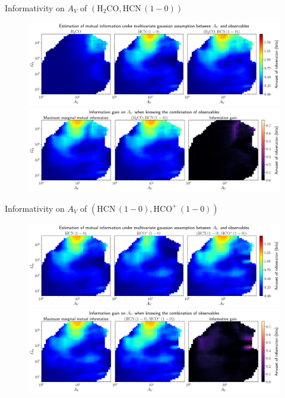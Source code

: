 \documentclass{beamer}
\begin{document}
\begin{frame}{Informativity on $A_V$ of $\left(\mathrm{H_2CO},\mathrm{HCN\,(1-0)}\right)$}
    \begin{figure}
        \centering
        \includegraphics[width=0.95\linewidth]{../linearinfo/av__h2co_hcn10_linearinfo.png}
        \vfill
        \includegraphics[width=0.95\linewidth]{../linearinfo/av__h2co_hcn10_linearinfo_gain.png}
    \end{figure}
\end{frame}

\begin{frame}{Informativity on $A_V$ of $\left(\mathrm{HCN\,(1-0)},\mathrm{HCO^+\,(1-0)}\right)$}
    \begin{figure}
        \centering
        \includegraphics[width=0.95\linewidth]{../linearinfo/av__hcn10_hcop10_linearinfo.png}
        \vfill
        \includegraphics[width=0.95\linewidth]{../linearinfo/av__hcn10_hcop10_linearinfo_gain.png}
    \end{figure}
\end{frame}
\end{document}
